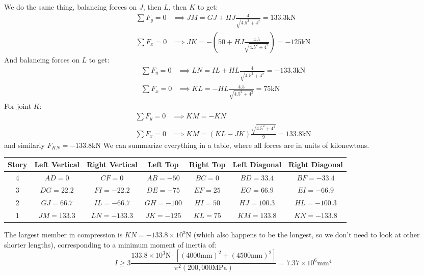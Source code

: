 \documentclass{article}
\begin{document}
We do the same thing, balancing forces on $J$, then $L$, then $K$ to get:
\begin{align}
    \sum F_y = 0 &\implies JM=GJ+HJ\frac{4}{\sqrt{4.5^2+4^2}} = 133.3\si{\kilo\newton} \\ 
    \sum F_x = 0 &\implies JK = -\left(50+HJ\frac{4.5}{\sqrt{4.5^2+4^2}}\right) = -125\si{\kilo\newton}
\end{align}
And balancing forces on $L$ to get:
\begin{align}
    \sum F_y = 0 &\implies LN=IL+HL\frac{4}{\sqrt{4.5^2+4^2}} = -133.3 \si{\kilo\newton} \\ 
    \sum F_x = 0 &\implies KL = -HL\frac{4.5}{\sqrt{4.5^2+4^2}} = 75\si{\kilo\newton}
\end{align}
For joint $K$:
\begin{align}
    \sum F_y = 0 &\implies KM = - KN \\ 
    \sum F_x = 0 &\implies KM = \left(KL-JK\right)\frac{\sqrt{4.5^2+4^2}}{9} = 133.8\si{\kilo\newton}
\end{align}
and similarly $F_{KN}=-133.8\si{\kilo\newton}$
We can summarize everything in a table, where all forces are in units of kilonewtons.
\begin{center}
    \begin{tabular}{|c|c|c|c|c|c|c|}
        \hline
        Story & Left Vertical & Right Vertical & Left Top  & Right Top & Left Diagonal & Right Diagonal \\ \hline
        4     & $AD=0$        & $CF=0$         & $AB=-50$  & $BC=0$    & $BD=33.4$     & $BF=-33.4$     \\ \hline
        3     & $DG=22.2$     & $FI=-22.2$     & $DE=-75$  & $EF=25$   & $EG=66.9$        & $EI=-66.9$     \\ \hline
        2     & $GJ=66.7$     & $IL=-66.7$     & $GH=-100$ & $HI=50$   & $HJ=100.3$    & $HL=-100.3$    \\ \hline
        1     & $JM=133.3$    & $LN=-133.3$    & $JK=-125$ & $KL=75$   & $KM=133.8$    & $KN=-133.8$    \\ \hline
    \end{tabular}
\end{center}
The largest member in compression is $KN=-133.8\times 10^3 \si{\newton}$ (which also happens to be the longest, so we don't need to look at other shorter lengths), corresponding to a minimum moment of inertia of:
    \begin{equation}
        I \ge 3\frac{133.8\times 10^3 \si{\newton} \cdot \left[(4000 \si{\milli\meter})^2+(4500 \si{\milli\meter})^2\right]}{\pi^2 (200,000\si{\mega\pascal})} = 7.37 \times 10^6 \si{\milli\meter\tothe{4}}
        \label{eq:}
    \end{equation}
\end{document}
